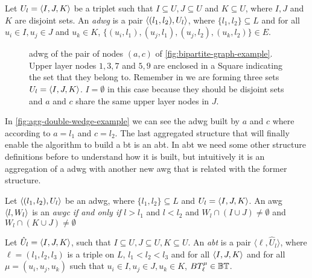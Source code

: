 \begin{definition}\label{def:adwg}
Let $U_l = \left\langle I, J, K\right\rangle$ be a triplet such that $I \subseteq U, J \subseteq U$ and $K \subseteq U$, where $I, J$ and $K$ are disjoint sets. 
An \textit{\acrfull{adwg}}  is a pair  $\left\langle (l_1, l_2), U_l \right\rangle$, where $\{l_1,l_2\}\subseteq L$ and  for all $u_i \in I, u_j \in J$ and $u_k \in K$, $\{(u_i, l_1), (u_j, l_1), (u_j, l_2), (u_k, l_2)\} \in E$.
\end{definition}
      
\begin{figure}[htp!]
\centering
{}
\caption[{[\acrshort{iebt}] Example Aggregated double-wedge}]{\acrlong{adwg} of the pair of nodes $(a,c)$ of \autoref{fig:bipartite-graph-example}. Upper layer nodes $1,3,7$ and $5,9$ are enclosed in a Square indicating the set that they belong to. Remember in  we are forming three sets $U_l = \left\langle I, J, K \right\rangle$. $I = \emptyset$ in this case because they should be disjoint sets and $a$ and $c$ share the same upper layer nodes in $J$.}
\label{fig:agg-double-wedge-example}
\end{figure}

In \autoref{fig:agg-double-wedge-example} we can see the \acrshort{adwg} built by $a$ and $c$ where according to  $a = l_1$ and $c = l_2$.
The last aggregated structure that will finally enable the algorithm to build a \acrshort{bt} is an \acrlong{abt}. In \acrshort{abt} we need some other structure definitions before to understand how it is built, but intuitively it is an aggregation of a \acrshort{adwg} with another new \acrshort{awg} that is related with the former structure.

\begin{definition}\label{def:awgc}
Let $\left\langle (l_1, l_2), U_l \right\rangle$ be an \acrshort{adwg}, where $\{l_1,l_2\}\subseteq L$ and $U_l = \left\langle I, J, K\right\rangle$.
An \acrshort{awg} $\left\langle l, W_l \right\rangle$ is an \textit{\acrfull{awgc}} \emph{if and only if} $l > l_1$ and $l < l_2$ and $W_l \cap (I \cup J) \neq \emptyset$ and $W_l \cap (K \cup J) \neq \emptyset$
\end{definition}
      
\begin{definition}\label{def:abt}
Let $\hat{U}_l=\left\langle I, J, K\right\rangle$, such that $I \subseteq U, J \subseteq U, K \subseteq U$. An \textit{\acrfull{abt}}  is a pair  $\langle \ell, \hat{U}_l\rangle$, 
where $\ell=(l_1, l_2, l_3)$ is a triple on $L$, $l_1 < l_2 < l_3$ and for all $\left\langle I, J, K\right\rangle$ and for all $\mu=(u_i, u_j, u_k)$ such that $u_i \in I, u_j \in J, u_k \in K$, $BT_{\ell}^{\mu}\in \mathbb{BT}$.
\end{definition}
      
